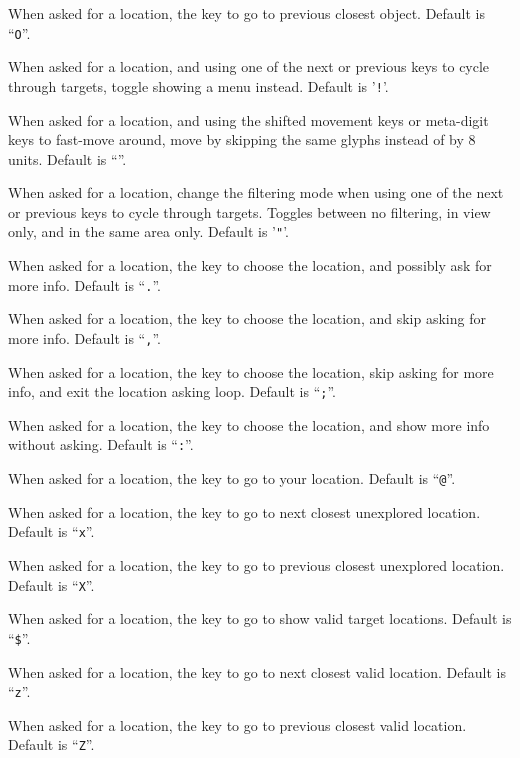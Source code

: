 When asked for a location, the key to go to previous closest object. Default is ``{\tt O}''.
\item{}
When asked for a location, and using one of the next or previous keys to cycle through targets, toggle showing a menu instead. Default is '{\tt !}'.
\item{}
When asked for a location, and using the shifted movement keys or meta-digit keys to fast-move around, move by skipping the same glyphs instead of by 8 units. Default is ``{\tt *}''.
\item{}
When asked for a location, change the filtering mode when using one of the next or previous keys to cycle through targets. Toggles between no filtering, in view only, and in the same area only. Default is '{\tt "}'.
\item{}
When asked for a location, the key to choose the location, and possibly ask for more info. Default is ``{\tt .}''.
\item{}
When asked for a location, the key to choose the location, and skip asking for more info. Default is ``{\tt ,}''.
\item{}
When asked for a location, the key to choose the location, skip asking for more info, and exit the location asking loop. Default is ``{\tt ;}''.
\item{}
When asked for a location, the key to choose the location, and show more info without asking. Default is ``{\tt :}''.
\item{}
When asked for a location, the key to go to your location. Default is ``{\tt @}''.
\item{}
When asked for a location, the key to go to next closest unexplored location. Default is ``{\tt x}''.
\item{}
When asked for a location, the key to go to previous closest unexplored location. Default is ``{\tt X}''.
\item{}
When asked for a location, the key to go to show valid target locations. Default is ``{\tt \$}''.
\item{}
When asked for a location, the key to go to next closest valid location. Default is ``{\tt z}''.
\item{}
When asked for a location, the key to go to previous closest valid location. Default is ``{\tt Z}''.
